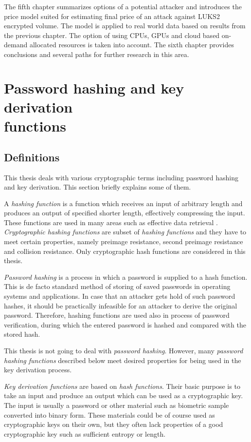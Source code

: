 \documentclass[nolof]{fithesis3}
\begin{document}
The fifth chapter summarizes options of a potential attacker and introduces the price model suited for estimating final price of an attack against LUKS2 encrypted volume. The model is applied to real world data based on results from the previous chapter. The option of using CPUs, GPUs and cloud based on-demand allocated resources is taken into account. The sixth chapter provides conclusions and several paths for further research in this area.

\chapter{Password hashing and key derivation\\functions}

\section{Definitions}
\label{definitions}
This thesis deals with various cryptographic terms including password hashing and key derivation. This section briefly explains some of them.

A \emph{hashing function} is a function which receives an input of arbitrary length and produces an output of specified shorter length, effectively compressing the input. These functions are used in many areas such as effective data retrieval \parencite{itmc14}. \emph{Cryptographic hashing functions} are subset of \emph{hashing functions} and they have to meet certain properties, namely preimage resistance, second preimage resistance and collision resistance. Only cryptographic hash functions are considered in this thesis.

\emph{Password hashing} is a process in which a password is supplied to a hash function. This is de facto standard method of storing of saved passwords in operating systems and applications. In case that an attacker gets hold of such password hashes, it should be practically infeasible for an attacker to derive the original password. Therefore, hashing functions are used also in process of password verification, during which the entered password is hashed and compared with the stored hash.

This thesis is not going to deal with \emph{password hashing}. However, many \emph{password hashing functions} described below meet desired properties for being used in the key derivation process.

\emph{Key derivation functions} are based on \emph{hash functions}. Their basic purpose is to take an input and produce an output which can be used as a cryptographic key. The input is usually a password or other material such as biometric sample converted into binary form. These materials could be of course used as cryptographic keys on their own, but they often lack properties of a good cryptographic key such as sufficient entropy or length. 
\end{document}
